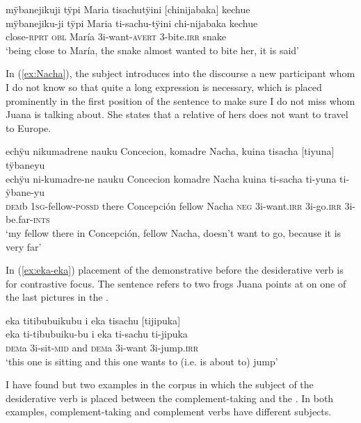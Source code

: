 \ea\label{ex:want-bite}
\begingl
\glpreamble mÿbanejikuji tÿpi Maria tisachutÿini \textup{[}chinijabaka\textup{]} kechue\\
\gla mÿbanejiku-ji tÿpi Maria ti-sachu-tÿini chi-nijabaka kechue\\
\glb close-\textsc{rprt} \textsc{obl} María 3i-want-\textsc{avert} 3-bite.\textsc{irr} snake\\
\glft ‘being close to María, the snake almost wanted to bite her, it is said’
\endgl
\trailingcitation{[jxx-p120515l-2.161]}
\xe

In (\ref{ex:Nacha}), the subject introduces into the discourse a new participant whom I do not know so that quite a long expression is necessary, which is placed prominently in the first position of the sentence to make sure I do not miss whom Juana is talking about. She states that a relative of hers does not want to travel to Europe.

\ea\label{ex:Nacha}
\begingl
\glpreamble echÿu nikumadrene nauku Concecion, komadre Nacha, kuina tisacha \textup{[}tiyuna\textup{]} tÿbaneyu\\
\gla echÿu ni-kumadre-ne nauku Concecion komadre Nacha kuina ti-sacha ti-yuna ti-ÿbane-yu\\
\glb \textsc{dem}b 1\textsc{sg}-fellow-\textsc{possd} there Concepción fellow Nacha \textsc{neg} 3i-want.\textsc{irr} 3i-go.\textsc{irr} 3i-be.far-\textsc{ints}\\
\glft ‘my fellow there in Concepción, fellow Nacha, doesn’t want to go, because it is very far’
\endgl
\trailingcitation{[jxx-p120430l-1.175]}
\xe

In (\ref{ex:eka-eka}) placement of the demonstrative before the desiderative verb is for contrastive focus. The sentence refers to two frogs Juana points at on one of the last pictures in the .


\ea\label{ex:eka-eka}
\begingl
\glpreamble eka titibubuikubu i eka tisachu \textup{[}tijipuka\textup{]}\\
\gla eka ti-tibubuiku-bu i eka ti-sachu ti-jipuka\\
\glb \textsc{dem}a 3i-sit-\textsc{mid} and \textsc{dem}a 3i-want 3i-jump.\textsc{irr}\\
\glft ‘this one is sitting and this one wants to (i.e. is about to) jump’
\endgl
\trailingcitation{[jxx-a120516l-a.521-522]}
\xe


I have found but two examples in the corpus in which the subject of the desiderative verb is placed between the complement-taking and the . In both examples, complement-taking and complement verbs have different subjects.

